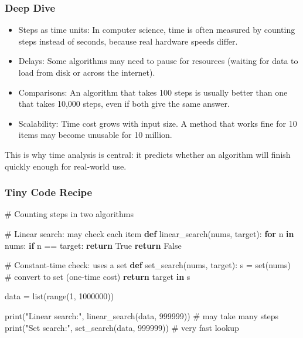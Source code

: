 \documentclass[
  letterpaper,
  DIV=11,
  numbers=noendperiod]{scrreprt}
\newenvironment{Shaded}{\begin{snugshade}}{\end{snugshade}}
\newcommand{\BuiltInTok}[1]{\textcolor[rgb]{0.00,0.23,0.31}{#1}}
\newcommand{\CommentTok}[1]{\textcolor[rgb]{0.37,0.37,0.37}{#1}}
\newcommand{\ControlFlowTok}[1]{\textcolor[rgb]{0.00,0.23,0.31}{\textbf{#1}}}
\newcommand{\DecValTok}[1]{\textcolor[rgb]{0.68,0.00,0.00}{#1}}
\newcommand{\KeywordTok}[1]{\textcolor[rgb]{0.00,0.23,0.31}{\textbf{#1}}}
\newcommand{\NormalTok}[1]{\textcolor[rgb]{0.00,0.23,0.31}{#1}}
\newcommand{\OperatorTok}[1]{\textcolor[rgb]{0.37,0.37,0.37}{#1}}
\newcommand{\StringTok}[1]{\textcolor[rgb]{0.13,0.47,0.30}{#1}}
\newcommand{\VariableTok}[1]{\textcolor[rgb]{0.07,0.07,0.07}{#1}}
\providecommand{\tightlist}{%
  \setlength{\itemsep}{0pt}\setlength{\parskip}{0pt}}
\begin{document}
\subsubsection{Deep Dive}\label{deep-dive-42}

\begin{itemize}
\tightlist
\item
  Steps as time units: In computer science, time is often measured by
  counting steps instead of seconds, because real hardware speeds
  differ.
\item
  Delays: Some algorithms may need to pause for resources (waiting for
  data to load from disk or across the internet).
\item
  Comparisons: An algorithm that takes 100 steps is usually better than
  one that takes 10,000 steps, even if both give the same answer.
\item
  Scalability: Time cost grows with input size. A method that works fine
  for 10 items may become unusable for 10 million.
\end{itemize}

This is why time analysis is central: it predicts whether an algorithm
will finish quickly enough for real-world use.

\subsubsection{Tiny Code Recipe}\label{tiny-code-recipe-70}

\begin{Shaded}
\begin{Highlighting}[]
\CommentTok{\# Counting steps in two algorithms}

\CommentTok{\# Linear search: may check each item}
\KeywordTok{def}\NormalTok{ linear\_search(nums, target):}
    \ControlFlowTok{for}\NormalTok{ n }\KeywordTok{in}\NormalTok{ nums:}
        \ControlFlowTok{if}\NormalTok{ n }\OperatorTok{==}\NormalTok{ target:}
            \ControlFlowTok{return} \VariableTok{True}
    \ControlFlowTok{return} \VariableTok{False}

\CommentTok{\# Constant{-}time check: uses a set}
\KeywordTok{def}\NormalTok{ set\_search(nums, target):}
\NormalTok{    s }\OperatorTok{=} \BuiltInTok{set}\NormalTok{(nums)  }\CommentTok{\# convert to set (one{-}time cost)}
    \ControlFlowTok{return}\NormalTok{ target }\KeywordTok{in}\NormalTok{ s}

\NormalTok{data }\OperatorTok{=} \BuiltInTok{list}\NormalTok{(}\BuiltInTok{range}\NormalTok{(}\DecValTok{1}\NormalTok{, }\DecValTok{1000000}\NormalTok{))}

\BuiltInTok{print}\NormalTok{(}\StringTok{"Linear search:"}\NormalTok{, linear\_search(data, }\DecValTok{999999}\NormalTok{))  }\CommentTok{\# may take many steps}
\BuiltInTok{print}\NormalTok{(}\StringTok{"Set search:"}\NormalTok{, set\_search(data, }\DecValTok{999999}\NormalTok{))        }\CommentTok{\# very fast lookup}
\end{Highlighting}
\end{Shaded}
\end{document}

